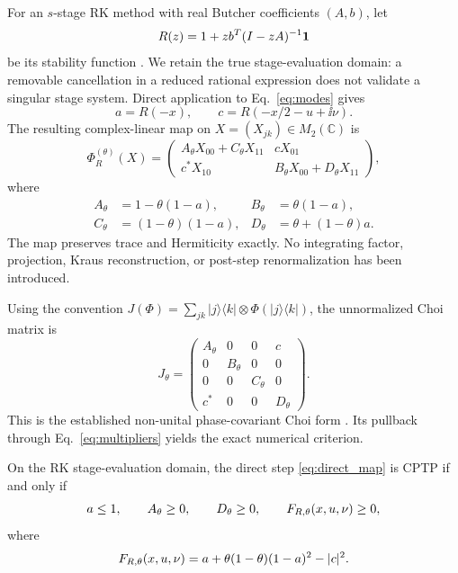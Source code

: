 For an $s$-stage RK method with real Butcher coefficients $(A,b)$, let
\begin{equation}
 R(z)=1+z b^T(I-zA)^{-1}{\bf 1}
 \label{eq:stability_function}
\end{equation}
be its stability function \cite{HairerNorsettWanner1993}. We retain the true stage-evaluation domain: a removable cancellation in a reduced rational expression does not validate a singular stage system. Direct application to Eq.~\eqref{eq:modes} gives
\begin{equation}
 a=R(-x),
 \qquad
 c=R(-x/2-u+\ii\nu).
 \label{eq:multipliers}
\end{equation}
The resulting complex-linear map on $X=(X_{jk})\in M_2(\mathbb C)$ is
\begin{equation}
 \Phi_{R}^{(\theta)}(X)=
 \begin{pmatrix}
 A_\theta X_{00}+C_\theta X_{11} & cX_{01}\\
 c^*X_{10} & B_\theta X_{00}+D_\theta X_{11}
 \end{pmatrix},
 \label{eq:direct_map}
\end{equation}
where
\begin{align}
 A_\theta&=1-\theta(1-a), & B_\theta&=\theta(1-a),\nonumber\\
 C_\theta&=(1-\theta)(1-a), & D_\theta&=\theta+(1-\theta)a.
 \label{eq:ABCD}
\end{align}
The map preserves trace and Hermiticity exactly. No integrating factor, projection, Kraus reconstruction, or post-step renormalization has been introduced.

Using the convention $J(\Phi)=\sum_{jk}|j\rangle\langle k|\otimes\Phi(|j\rangle\langle k|)$, the unnormalized Choi matrix is
\begin{equation}
 J_\theta=
 \begin{pmatrix}
 A_\theta&0&0&c\\
 0&B_\theta&0&0\\
 0&0&C_\theta&0\\
 c^*&0&0&D_\theta
 \end{pmatrix}.
 \label{eq:thermal_choi}
\end{equation}
This is the established non-unital phase-covariant Choi form \cite{Choi1975CP,RuskaiSzarekWerner2002,BraunEtAl2014,Siudzinska2023Geometry}. Its pullback through Eq.~\eqref{eq:multipliers} yields the exact numerical criterion.

\begin{theorem}
\label{thm:criterion}
On the RK stage-evaluation domain, the direct step \eqref{eq:direct_map} is CPTP if and only if
\begin{equation}
 a\le1,
 \qquad A_\theta\ge0,
 \qquad D_\theta\ge0,
 \qquad F_{R,\theta}(x,u,\nu)\ge0,
 \label{eq:full_criterion}
\end{equation}
where
\begin{equation}
 F_{R,\theta}(x,u,\nu)=a+\theta(1-\theta)(1-a)^2-|c|^2.
 \label{eq:full_margin}
\end{equation}
\end{theorem}

